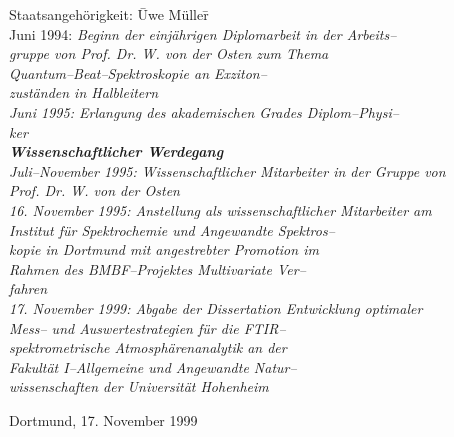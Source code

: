 
\begin{tabbing}
\rm Staatsangeh\"{o}rigkeit: \hspace{2.3cm}\= Uwe
M\"{u}ller\hspace{17mm}\=\kill \\

\rm Juni 1994: \> \sl Beginn der einj\"{a}hrigen Diplomarbeit in der
Arbeits--\\ \> \sl gruppe von Prof. Dr. W. von der Osten zum
Thema\\ \> \sc Quantum--Beat--Spektroskopie an Exziton--\\ \> \sc
zust\"{a}nden in Halbleitern\\[5ex]

\rm Juni 1995: \> \sl Erlangung des akademischen Grades
Diplom--Physi--\\ \> \sl ker\\[5ex]

{\large \bf Wissenschaftlicher Werdegang}\\[5mm] \rm
Juli--November 1995: \> \sl Wissenschaftlicher Mitarbeiter in der
Gruppe von\\ \> \sl Prof. Dr. W. von der Osten\\[5ex]

16. November 1995: \> \sl Anstellung als wissenschaftlicher
Mitarbeiter am\\ \> \sl Institut f\"{u}r Spektrochemie und Angewandte
Spektros--\\ \> \sl kopie in Dortmund mit angestrebter Promotion
im\\ \> \sl Rahmen des BMBF--Projektes \sc Multivariate Ver--\\ \>
\sc fahren\\[5ex]

17. November 1999: \> \sl Abgabe der Dissertation \sc Entwicklung
optimaler\\ \> \sc Mess-- und Auswertestrategien f\"{u}r die FTIR--\\
\> \sc spektrometrische Atmosph\"{a}renanalytik \sl an der\\ \> \sl
Fakult\"{a}t I--Allgemeine und Angewandte Natur--\\ \> \sl
wissenschaften der Universit\"{a}t Hohenheim\\[10ex]

\end{tabbing}

\noindent\rm Dortmund, 17. November 1999
